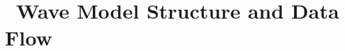 \section{~Wave Model Structure and Data Flow} \label{chapt:run}
\newcounters































